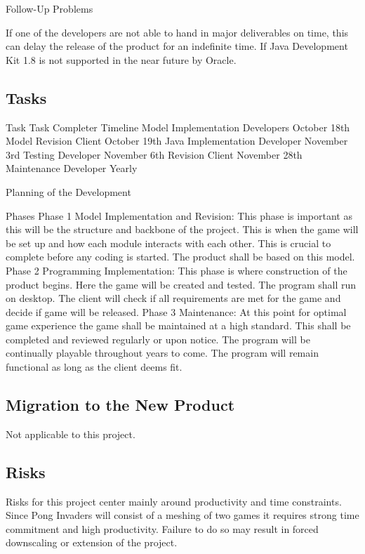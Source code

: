 \documentclass[12pt, titlepage]{article}
\begin{document}
Follow-Up Problems 

If one of the developers are not able to hand in major deliverables on time, this can delay the release of the product for an indefinite time. If Java Development Kit 1.8 is not supported in the near future by Oracle.

\subsection{Tasks}

Task
Task Completer 
Timeline
Model Implementation
Developers
October 18th
Model Revision
Client
October 19th
Java Implementation
Developer
November 3rd
Testing
Developer
November 6th
Revision
Client
November 28th
Maintenance
Developer
Yearly

Planning of the Development 

Phases Phase 1 Model Implementation and Revision: This phase is important as this will be the structure and backbone of the project. This is when the game will be set up  and how each module interacts with each other. This is crucial to complete before any coding is started. The product shall be based on this model. Phase 2 Programming Implementation: This phase is where construction of the product begins. Here the game will be created and tested. The program shall run on desktop. The client will check if all requirements are met for the game and decide if game will be released. Phase 3 Maintenance: At this point for optimal game experience the game shall be maintained at a high standard. This shall be completed and reviewed regularly or upon notice. The program will be continually playable throughout years to come. The program will remain functional as long as the client deems fit. 


\subsection{Migration to the New Product}
Not applicable to this project.

\subsection{Risks}
Risks for this project center mainly around productivity and time constraints. Since Pong Invaders will consist of a meshing of two games it requires strong time commitment and high productivity. Failure to do so may result in forced downscaling or extension of the project. 
\end{document}
